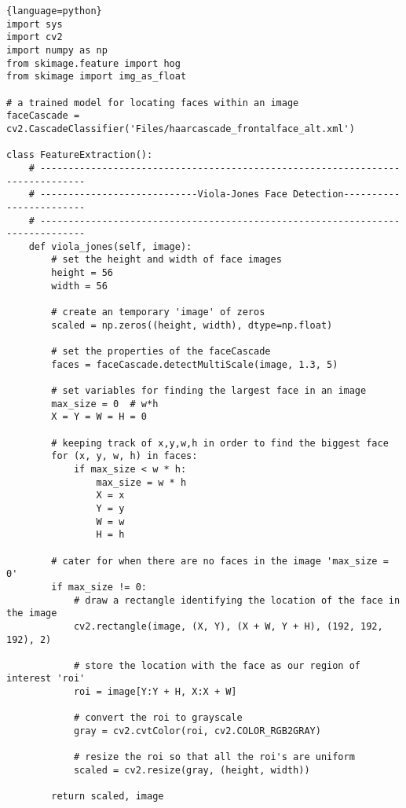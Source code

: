     
\begin{lstlisting}{language=python}    
import sys
import cv2
import numpy as np
from skimage.feature import hog
from skimage import img_as_float

# a trained model for locating faces within an image
faceCascade = cv2.CascadeClassifier('Files/haarcascade_frontalface_alt.xml')

class FeatureExtraction():
    # ------------------------------------------------------------------------------
    # ----------------------------Viola-Jones Face Detection------------------------
    # ------------------------------------------------------------------------------
    def viola_jones(self, image):
        # set the height and width of face images
        height = 56
        width = 56
		
        # create an temporary 'image' of zeros
        scaled = np.zeros((height, width), dtype=np.float)
		
        # set the properties of the faceCascade
        faces = faceCascade.detectMultiScale(image, 1.3, 5)

        # set variables for finding the largest face in an image 
        max_size = 0  # w*h
        X = Y = W = H = 0
		
        # keeping track of x,y,w,h in order to find the biggest face
        for (x, y, w, h) in faces:  
            if max_size < w * h:
                max_size = w * h
                X = x
                Y = y
                W = w
                H = h
				
        # cater for when there are no faces in the image 'max_size = 0'
        if max_size != 0:
            # draw a rectangle identifying the location of the face in the image
            cv2.rectangle(image, (X, Y), (X + W, Y + H), (192, 192, 192), 2)
			
            # store the location with the face as our region of interest 'roi'
            roi = image[Y:Y + H, X:X + W]
			
            # convert the roi to grayscale
            gray = cv2.cvtColor(roi, cv2.COLOR_RGB2GRAY)
			
            # resize the roi so that all the roi's are uniform
            scaled = cv2.resize(gray, (height, width))

        return scaled, image


\end{lstlisting}
